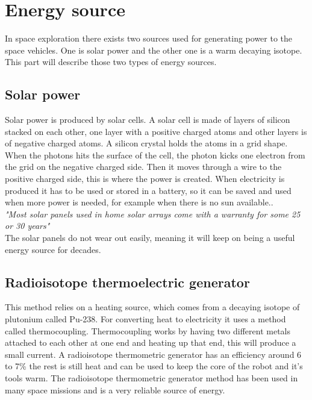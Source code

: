 \section{Energy source}

In space exploration there exists two sources used for generating power to the space vehicles. One is solar power and the other one is a warm decaying isotope. \newline This part will describe those two types of energy sources.

\subsection{Solar power}

Solar power is produced by solar cells. A solar cell is made of layers of silicon stacked on each other, one layer with a positive charged atoms and other layers is of negative charged atoms. A silicon crystal holds the atoms in a grid shape. When the photons hits the surface of the cell, the photon kicks one electron from the grid on the negative charged side. Then it moves through a wire to the positive charged side, this is where the power is created. When electricity is produced it has to be used or stored in a battery, so it can be saved and used when more power is needed, for example when there is no sun available.\cite{SolarPanels}.\\

\textit{"Most solar panels used in home solar arrays come with a warranty for some 25 or 30 years"}\cite{SolarPanels}
\\
\newline
The solar panels do not wear out easily, meaning it will keep on being a useful energy source for decades.




\subsection{Radioisotope thermoelectric generator}

This method relies on a heating source, which comes from a decaying isotope of plutonium called Pu-238. For converting heat to electricity it uses a method called thermocoupling. Thermocoupling works by having two different metals attached to each other at one end and heating up that end, this will produce a small current.
A radioisotope thermometric generator has an efficiency around 6 to 7\% the rest is still heat and can be used to keep the core of the robot and it's tools warm. The radioisotope thermometric generator method has been used in many space missions and is a very reliable source of energy\cite{RTG}.


